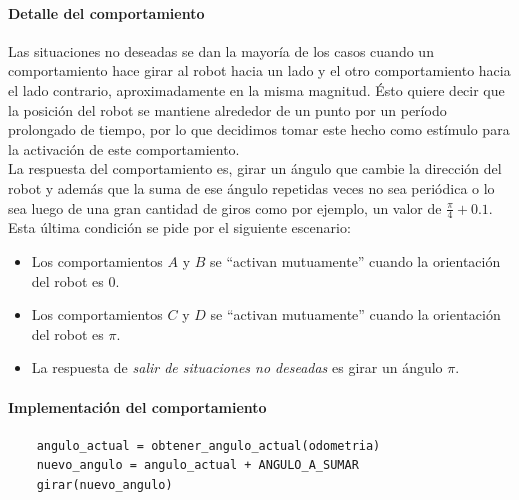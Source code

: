 \paragraph{Detalle del comportamiento}
Las situaciones no deseadas se dan la mayor\'ia de los casos cuando un
comportamiento hace girar al robot hacia un lado y el otro comportamiento hacia
el lado contrario, aproximadamente en la misma magnitud. \'Esto quiere decir
que la posici\'on del robot se mantiene alrededor de un punto por un per\'iodo
prolongado de tiempo, por lo que decidimos tomar este hecho como est\'imulo
para la activaci\'on de este comportamiento.
\\\indent
La respuesta del comportamiento es, girar un \'angulo que cambie la
direcci\'on del robot y adem\'as que la suma de ese \'angulo repetidas veces no
sea peri\'odica o lo sea luego de una gran cantidad de giros como por ejemplo,
un valor de $\frac{\pi}{4}+0.1$.
Esta \'ultima condici\'on se pide por el siguiente escenario:
\begin{itemize}
	\item Los comportamientos $A$ y $B$ se ``activan mutuamente'' cuando la
		orientaci\'on del robot es $0$.
	\item Los comportamientos $C$ y $D$ se ``activan mutuamente'' cuando la
		orientaci\'on del robot es $\pi$.
	\item La respuesta de \emph{salir de situaciones no deseadas} es girar un
		\'angulo $\pi$.
\end{itemize}

\paragraph{Implementaci\'on del comportamiento}
\begin{verbatim}
    angulo_actual = obtener_angulo_actual(odometria)
    nuevo_angulo = angulo_actual + ANGULO_A_SUMAR
    girar(nuevo_angulo)
\end{verbatim}

